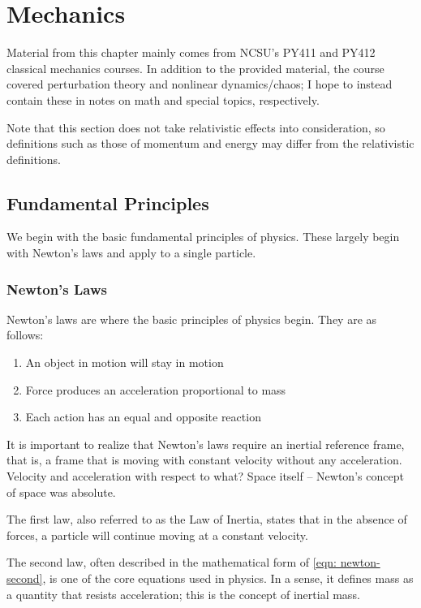\documentclass[main.tex]{subfiles}
\begin{document}
\chapter{Mechanics}


Material from this chapter mainly comes from NCSU's PY411 and PY412 classical
mechanics courses. In addition to the provided material, the course covered perturbation
theory and nonlinear dynamics/chaos; I hope to instead contain these in notes on math
and special topics, respectively.

Note that this section does not take relativistic effects into consideration, so definitions
such as those of momentum and energy may differ from the relativistic definitions.

\section{Fundamental Principles}

We begin with the basic fundamental principles of physics. These largely begin with
Newton's laws and apply to a single particle.

\subsection{Newton's Laws}


Newton's laws are where the basic principles of physics begin. They are as follows:

\begin{enumerate}
\item An object in motion will stay in motion
\item Force produces an acceleration proportional to mass
\item Each action has an equal and opposite reaction
\end{enumerate}

It is important to realize that Newton's laws require an inertial reference frame, that is,
a frame that is moving with constant velocity without any acceleration. Velocity and
acceleration with respect to what? Space itself -- Newton's concept of space was absolute.

The first law, also referred to as the Law of Inertia, states that in the absence of forces,
a particle will continue moving at a constant velocity.

The second law, often described in the mathematical form of \cref{eqn: newton-second},
is one of the core equations used in physics. In a sense, it defines mass as a quantity
that resists acceleration; this is the concept of inertial mass.
\end{document}
